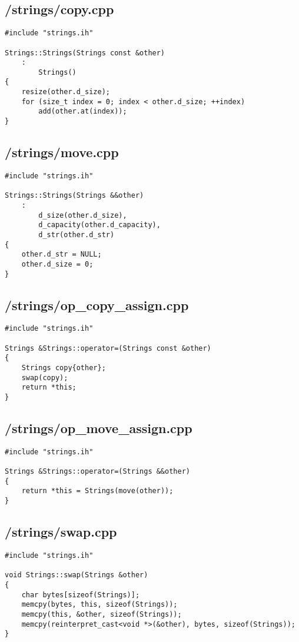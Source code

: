 \documentclass{article}
\begin{document}
\subsection*{/strings/copy.cpp}
\begin{verbatim}
#include "strings.ih"

Strings::Strings(Strings const &other)
	:
        Strings()
{
    resize(other.d_size);
    for (size_t index = 0; index < other.d_size; ++index)
        add(other.at(index));
}
\end{verbatim}
\subsection*{/strings/move.cpp}
\begin{verbatim}
#include "strings.ih"

Strings::Strings(Strings &&other)
    :
        d_size(other.d_size),
        d_capacity(other.d_capacity),
        d_str(other.d_str)
{
    other.d_str = NULL;
    other.d_size = 0;
}
\end{verbatim}
\subsection*{/strings/op\_copy\_assign.cpp}
\begin{verbatim}
#include "strings.ih"

Strings &Strings::operator=(Strings const &other)
{
    Strings copy{other};
    swap(copy);
    return *this;
}
\end{verbatim}
\subsection*{/strings/op\_move\_assign.cpp}
\begin{verbatim}
#include "strings.ih"

Strings &Strings::operator=(Strings &&other)
{
    return *this = Strings(move(other));
}
\end{verbatim}
\subsection*{/strings/swap.cpp}
\begin{verbatim}
#include "strings.ih"

void Strings::swap(Strings &other)
{
    char bytes[sizeof(Strings)];
    memcpy(bytes, this, sizeof(Strings));
    memcpy(this, &other, sizeof(Strings));
    memcpy(reinterpret_cast<void *>(&other), bytes, sizeof(Strings));
}

\end{verbatim}
\end{document}
